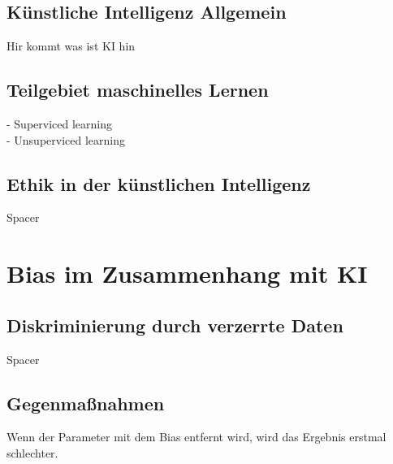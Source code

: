 \begin{onehalfspace}
        \subsection{Künstliche Intelligenz Allgemein}
        \label{subsubsec:KIAllgemein}
            Hir kommt was ist KI hin

            \cite{Cremers2019}
            \cite{Gröger2021}

        \subsection{Teilgebiet maschinelles Lernen}
        \label{subsubsec:teilgebietML}
            -   Superviced learning \\
            -   Unsuperviced learning \\

        \subsection{Ethik in der künstlichen Intelligenz}
        \label{subsubsec:ethikinderKI}
            Spacer


        \newpage
        \section{Bias im Zusammenhang mit \ac{KI}}
        \label{subsec:KIundbias}

        \subsection{Diskriminierung durch verzerrte Daten}
        \label{subsubsec:diskriminierungdurchverzerrung}
            Spacer

        \subsection{Gegenma{\ss}nahmen}
        \label{subsubsec:gegenmassnahmen}
            Wenn der Parameter mit dem Bias entfernt wird, wird das Ergebnis erstmal schlechter. 
            
    \newpage
    \end{onehalfspace}